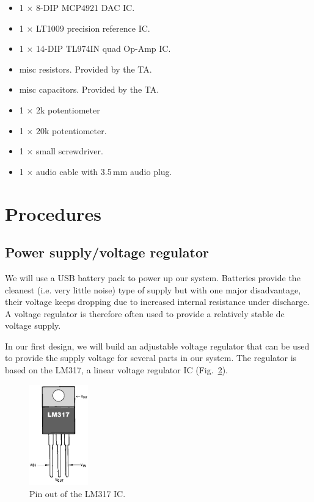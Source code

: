 \documentclass[letterpaper, 11pt]{article}
\begin{document}
\begin{itemize}[itemsep=0.5ex]
\begin{figure}[h]
		\label{fig:battery-pic}
	\end{figure}
\item 1 $\times$ 8-DIP MCP4921 DAC IC.
\item 1 $\times$ LT1009 precision reference IC.
\item 1 $\times$ 14-DIP TL974IN quad Op-Amp IC.
\item misc resistors. Provided by the TA.
\item misc capacitors. Provided by the TA. 
\item 1 $\times$ 2k potentiometer
\item 1 $\times$ 20k potentiometer.
\item 1 $\times$ small screwdriver.
\item 1 $\times$ audio cable with 3.5\,mm audio plug.
\end{itemize}

\newpage
\section{Procedures}

\subsection{Power supply/voltage regulator}
\label{sec:lm317}

We will use a USB battery pack to power up our system. Batteries provide the cleanest (i.e. very little noise) type of supply but with one major disadvantage, their voltage keeps dropping due to increased internal resistance under discharge. A voltage regulator is therefore often used to provide a relatively stable dc voltage supply.

In our first design, we will build an adjustable voltage regulator that can be used to provide the supply voltage for several parts in our system. The regulator is based on the LM317, a linear voltage regulator IC (Fig.~\ref{fig:lm317}).

\begin{figure}[h]
	\centering
	\includegraphics[width=1in]{lm317}
	\caption{Pin out of the LM317 IC.}
	\label{fig:lm317}
\end{figure}
\end{document}
